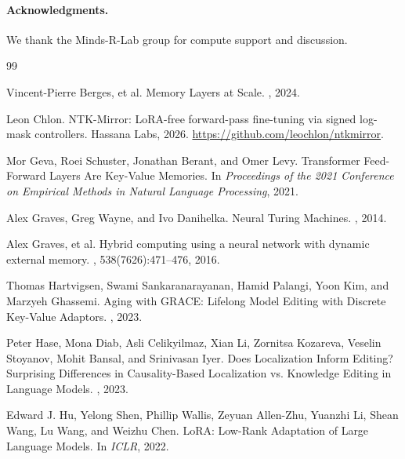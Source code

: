 \documentclass[11pt,a4paper]{article}
\begin{document}
\paragraph{Acknowledgments.}
We thank the Minds-R-Lab group for compute support and discussion.

\begin{thebibliography}{99}
\small

Vincent-Pierre Berges, et al.
\newblock Memory Layers at Scale.
, 2024.

Leon Chlon.
\newblock NTK-Mirror: LoRA-free forward-pass fine-tuning via signed log-mask controllers.
\newblock Hassana Labs, 2026.
\newblock \url{https://github.com/leochlon/ntkmirror}.

Mor Geva, Roei Schuster, Jonathan Berant, and Omer Levy.
\newblock Transformer Feed-Forward Layers Are Key-Value Memories.
\newblock In {\em Proceedings of the 2021 Conference on Empirical Methods in Natural Language Processing}, 2021.

Alex Graves, Greg Wayne, and Ivo Danihelka.
\newblock Neural Turing Machines.
, 2014.

Alex Graves, et al.
\newblock Hybrid computing using a neural network with dynamic external memory.
, 538(7626):471--476, 2016.

Thomas Hartvigsen, Swami Sankaranarayanan, Hamid Palangi, Yoon Kim, and Marzyeh Ghassemi.
\newblock Aging with GRACE: Lifelong Model Editing with Discrete Key-Value Adaptors.
, 2023.

Peter Hase, Mona Diab, Asli Celikyilmaz, Xian Li, Zornitsa Kozareva, Veselin Stoyanov, Mohit Bansal, and Srinivasan Iyer.
\newblock Does Localization Inform Editing? Surprising Differences in Causality-Based Localization vs. Knowledge Editing in Language Models.
, 2023.

Edward J. Hu, Yelong Shen, Phillip Wallis, Zeyuan Allen-Zhu, Yuanzhi Li, Shean Wang, Lu Wang, and Weizhu Chen.
\newblock LoRA: Low-Rank Adaptation of Large Language Models.
\newblock In {\em ICLR}, 2022.


\end{thebibliography}
\end{document}
